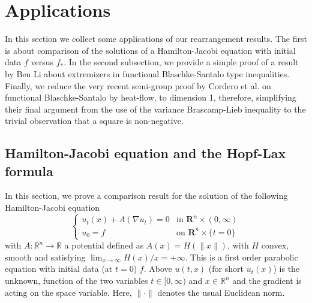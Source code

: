 \documentclass[11pt]{article}
\newcommand{\1}{[1]}
\begin{document}
\section{Applications} \label{sec:applications}

In this section we collect some applications of our rearrangement results.
The first is about comparison of the solutions of a Hamilton-Jacobi equation with initial data $f$ versus $f_*$. 
In the second subsection, we provide a simple proof of a result by Ben Li \cite{li} about extremizers in functional Blaschke-Santalo type inequalities. Finally, we reduce the very recent semi-group proof by Cordero et al.
\cite{cordero} on functional Blaschke-Santalo by heat-flow, to dimension 1, therefore, simplifying their final argument 
from the use of the variance Brascamp-Lieb inequality to the trivial observation that a square is non-negative. 


\subsection{Hamilton-Jacobi equation and the Hopf-Lax formula}\label{sec:HJ}

In this section, we prove a comparison result for the solution of the following Hamilton-Jacobi equation
\begin{equation} \label{eq:hj}
\begin{cases}
u_t(x) + A(\nabla u_t) = 0 & \mbox{in } \mathbf{R}^n \times (0 ,\infty) \\
u_0=f & \mbox{on } \mathbf{R}^n \times \{t =0\} 
\end{cases}
\end{equation}
with $A \colon \mathbb{R}^n \to \mathbb{R}$ a potential defined as $A(x)=H(\|x\|)$, with $H$ convex, smooth and satisfying $\lim_{x \to \infty} H(x)/x=+\infty$. This is a first order parabolic equation with initial data (at $t=0$) $f$.
Above $u(t,x)$ (for short $u_t(x)$) is the unknown,  function of the two variables $t \in [0,\infty)$ and $x \in \mathbb{R}^n$ and the gradient is acting on the space variable. Here, $\|\cdot\|$ denotes the usual Euclidean norm.
\end{document}
